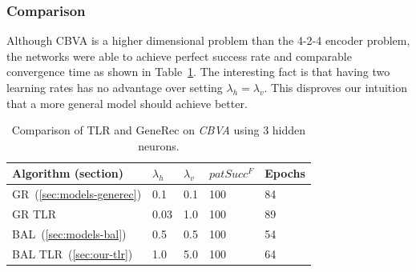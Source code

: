 \subsubsection{Comparison} 
\label{sec:results-cmp-k3} 
Although CBVA is a higher dimensional problem than the 4-2-4 encoder problem, the networks were able to achieve perfect success rate and comparable convergence time as shown in Table~\ref{tab:results-cmp-k3}. The interesting fact is that having two learning rates has no advantage over setting $\lambda_h = \lambda_v$. This disproves our intuition that a more general model should achieve better. 


\begin{table}[H] 
  \centering
    \begin{tabular}{|l|l|l|l|l|}
    \hline
    Algorithm (section)&$\lambda_h$&$\lambda_v$&$patSucc^F$ &Epochs\\ %
    \hline
    GR~(\ref{sec:models-generec}) & 0.1 & 0.1 & 100 & 84\\ %
    \hline
    GR TLR &0.03 & 1.0 & 100 & 89\\ %
    \hline
    BAL~(\ref{sec:models-bal})&0.5& 0.5&100& 54\\ %
    \hline
    BAL TLR~(\ref{sec:our-tlr})&1.0& 5.0 & 100& 64\\ %
    \hline 
    \end{tabular}
  \caption{Comparison of TLR and GeneRec on \emph{CBVA} using 3 hidden neurons.} 
  \label{tab:results-cmp-k3}
\end{table}




